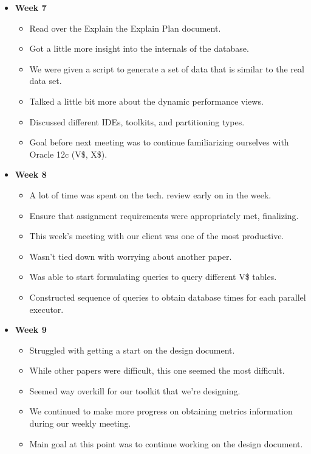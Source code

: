 \documentclass[xcolor=dvipsnames]{beamer}
\begin{document}
\begin{frame}
\begin{itemize}
	\item \textbf{Week 7}
   	\begin{itemize}
    	\item Read over the Explain the Explain Plan document.
    	\item Got a little more insight into the internals of the database.
    	\item We were given a script to generate a set of data that is similar to the real data set.
    	\item Talked a little bit more about the dynamic performance views.
    	\item Discussed different IDEs, toolkits, and partitioning types.
    	\item Goal before next meeting was to continue familiarizing ourselves with Oracle 12c (V\$, X\$).
	\end{itemize}
\end{itemize}
\end{frame}

\begin{frame}
\begin{itemize}
	\item \textbf{Week 8}
    \begin{itemize}
    	\item A lot of time was spent on the tech. review early on in the week.
    	\item Ensure that assignment requirements were appropriately met, finalizing.
    	\item This week's meeting with our client was one of the most productive.
    	\item Wasn't tied down with worrying about another paper.
    	\item Was able to start formulating queries to query different V\$ tables.
    	\item Constructed sequence of queries to obtain database times for each parallel executor.
	\end{itemize}
\end{itemize}
\end{frame}

\begin{frame}
\begin{itemize}
	\item \textbf{Week 9}
    \begin{itemize}
    	\item Struggled with getting a start on the design document.
    	\item While other papers were difficult, this one seemed the most difficult.
    	\item Seemed way overkill for our toolkit that we're designing.
    	\item We continued to make more progress on obtaining metrics information during our weekly meeting.
    	\item Main goal at this point was to continue working on the design document.
	\end{itemize}
\end{itemize}
\end{frame}
\end{document}
